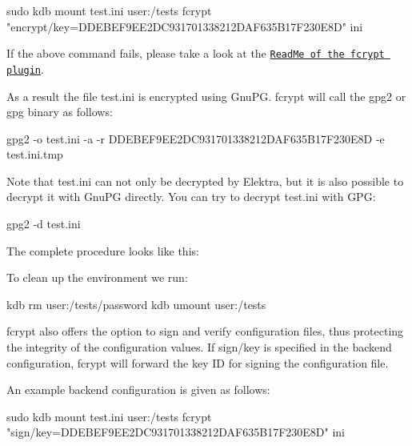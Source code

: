 \begin{DoxyCode}
sudo kdb mount test.ini user:/tests fcrypt "encrypt/key=DDEBEF9EE2DC931701338212DAF635B17F230E8D" ini
\end{DoxyCode}


If the above command fails, please take a look at the \href{https://master.libelektra.org/src/plugins/fcrypt/README.md#known-issues}{\tt Read\+Me of the {\ttfamily fcrypt} plugin}.

As a result the file {\ttfamily test.\+ini} is encrypted using Gnu\+PG. {\ttfamily fcrypt} will call the {\ttfamily gpg2} or {\ttfamily gpg} binary as follows\+:


\begin{DoxyCode}
gpg2 -o test.ini -a -r DDEBEF9EE2DC931701338212DAF635B17F230E8D -e test.ini.tmp
\end{DoxyCode}


Note that {\ttfamily test.\+ini} can not only be decrypted by Elektra, but it is also possible to decrypt it with Gnu\+PG directly. You can try to decrypt {\ttfamily test.\+ini} with G\+PG\+:


\begin{DoxyCode}
gpg2 -d test.ini
\end{DoxyCode}


The complete procedure looks like this\+:




To clean up the environment we run\+:


\begin{DoxyCode}
kdb rm user:/tests/password
kdb umount user:/tests
\end{DoxyCode}


{\ttfamily fcrypt} also offers the option to sign and verify configuration files, thus protecting the integrity of the configuration values. If {\ttfamily sign/key} is specified in the backend configuration, {\ttfamily fcrypt} will forward the key ID for signing the configuration file.

An example backend configuration is given as follows\+:


\begin{DoxyCode}
sudo kdb mount test.ini user:/tests fcrypt "sign/key=DDEBEF9EE2DC931701338212DAF635B17F230E8D" ini
\end{DoxyCode}


